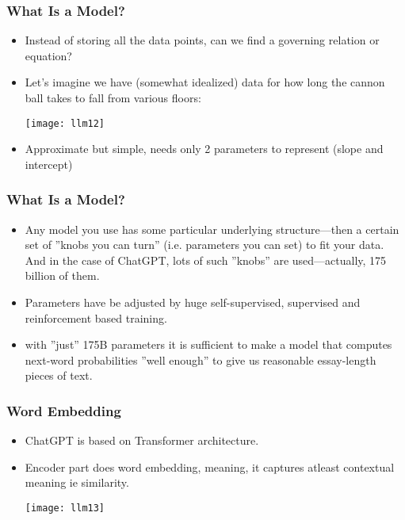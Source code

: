 \begin{frame}[fragile]\frametitle{What Is a Model?}

\begin{itemize}
\item Instead of storing all the data points, can we find a governing relation or equation?
\item Let’s imagine we have (somewhat idealized) data for how long the cannon ball takes to fall from various floors:

\begin{center}
\texttt{[image: llm12]}
\end{center}

\item Approximate but simple, needs only 2 parameters to represent (slope and intercept)

\end{itemize}

\end{frame}

\begin{frame}[fragile]\frametitle{What Is a Model?}

\begin{itemize}
\item Any model you use has some particular underlying structure—then a certain set of ''knobs you can turn'' (i.e. parameters you can set) to fit your data. And in the case of ChatGPT, lots of such ''knobs'' are used—actually, 175 billion of them.
\item Parameters have be adjusted by huge self-supervised, supervised and reinforcement based training.
\item with ''just'' 175B  parameters it is sufficient to make a model that computes next-word probabilities ''well enough'' to give us reasonable essay-length pieces of text.
\end{itemize}

\end{frame}



\begin{frame}[fragile]\frametitle{Word Embedding}

\begin{itemize}
\item ChatGPT is based on Transformer architecture.
\item Encoder part does word embedding, meaning, it captures atleast contextual meaning ie similarity.

\begin{center}
\texttt{[image: llm13]}
\end{center}

\end{itemize}

\end{frame}


